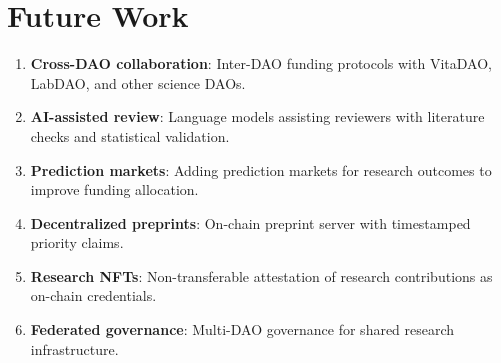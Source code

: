 \section{Future Work}

\label{sec:future}

\begin{enumerate}
  \item \textbf{Cross-DAO collaboration}: Inter-DAO funding protocols
    with VitaDAO, LabDAO, and other science DAOs.
  \item \textbf{AI-assisted review}: Language models assisting reviewers
    with literature checks and statistical validation.
  \item \textbf{Prediction markets}: Adding prediction markets for
    research outcomes to improve funding allocation.
  \item \textbf{Decentralized preprints}: On-chain preprint server with
    timestamped priority claims.
  \item \textbf{Research NFTs}: Non-transferable attestation of research
    contributions as on-chain credentials.
  \item \textbf{Federated governance}: Multi-DAO governance for shared
    research infrastructure.
\end{enumerate}


